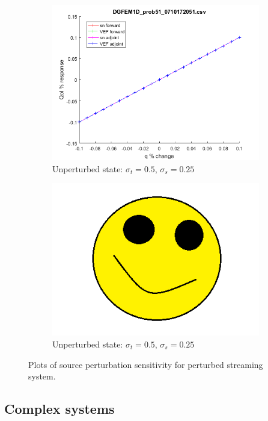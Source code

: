 \documentclass[12pt]{report}
\newcommand{\sigt}{\sigma_t}
\newcommand{\sigs}{\sigma_s}
\begin{document}
\begin{figure}[H]
\begin{subfigure}{.5\textwidth}
  \includegraphics[width=.98\linewidth]{figures/51qSens.png}
  \caption{Unperturbed state: $\sigt=0.5$, $\sigs=0.25$}
  \label{fig:sfig3}
\end{subfigure}%
\begin{subfigure}{.5\textwidth}
  \centering
  \includegraphics[width=.98\linewidth]{figures/holder.png}
  \caption{Unperturbed state: $\sigt=0.5$, $\sigs=0.25$}
  \label{fig:sfig6}
\end{subfigure}%
\caption{Plots of source perturbation sensitivity for perturbed streaming system.}
\label{fig:fig}
\end{figure}


\subsection{Complex systems}
\end{document}
